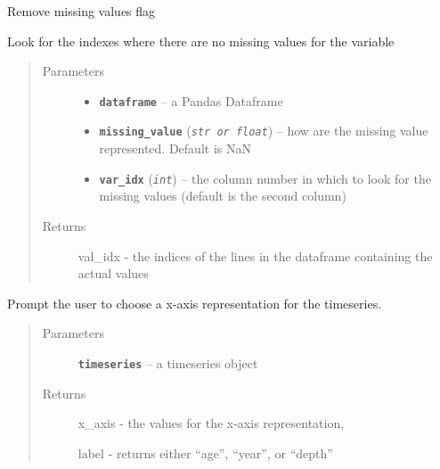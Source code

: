 \documentclass[letterpaper,10pt,english]{sphinxmanual}
\begin{document}
\begin{fulllineitems}
\label{LIPDutils:pyleoclim.valuesLoc}
Remove missing values flag

Look for the indexes where there are no missing values for the variable
\begin{quote}\begin{description}
\item[{Parameters}] \leavevmode\begin{itemize}
\item {} 
\textbf{\texttt{dataframe}} -- a Pandas Dataframe

\item {} 
\textbf{\texttt{missing\_value}} (\emph{\texttt{str or float}}) -- how are the missing value represented.
Default is NaN

\item {} 
\textbf{\texttt{var\_idx}} (\emph{\texttt{int}}) -- the column number in which to look for the missing
values (default is the second column)

\end{itemize}

\item[{Returns}] \leavevmode
val\_idx - the indices of the lines in the dataframe containing the actual values

\end{description}\end{quote}

\end{fulllineitems}


\begin{fulllineitems}
\label{LIPDutils:pyleoclim.xAxisTs}
Prompt the user to choose a x-axis representation for the timeseries.
\begin{quote}\begin{description}
\item[{Parameters}] \leavevmode
\textbf{\texttt{timeseries}} -- a timeseries object

\item[{Returns}] \leavevmode

x\_axis - the values for the x-axis representation,

label - returns either ``age'', ``year'', or ``depth''


\end{description}\end{quote}

\end{fulllineitems}
\end{document}
